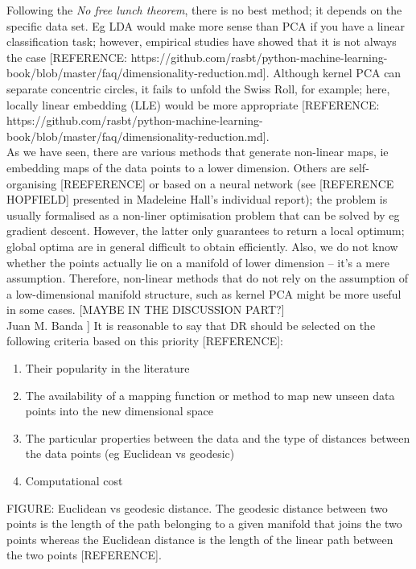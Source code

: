 \documentclass[journal, a4paper]{IEEEtran}
\begin{document}
Following the \textit{No free lunch theorem}, there is no best method; it depends on the specific data set.
Eg LDA would make more sense than PCA if you have a linear classification task; however, empirical studies have showed that it is not always the case [REFERENCE: https://github.com/rasbt/python-machine-learning-book/blob/master/faq/dimensionality-reduction.md]. Although kernel PCA can separate concentric circles, it fails to unfold the Swiss Roll, for example; here, locally linear embedding (LLE) would be more appropriate [REFERENCE: https://github.com/rasbt/python-machine-learning-book/blob/master/faq/dimensionality-reduction.md]. \\
As we have seen, there are various methods that generate non-linear maps, ie embedding maps of the data points to a lower dimension. Others are self-organising [REEFERENCE] or based on a neural network (see [REFERENCE HOPFIELD] presented in Madeleine Hall's individual report); the problem is usually formalised as a non-liner optimisation problem that can be solved by eg gradient descent. However, the latter only guarantees to return a local optimum; global optima are in general difficult to obtain efficiently. Also, we do not know whether the points actually lie on a manifold of lower dimension -- it's a mere assumption.
Therefore, non-linear methods that do not rely on the assumption of a low-dimensional manifold structure, such as kernel PCA might be more useful in some cases. [MAYBE IN THE DISCUSSION PART?]
\\
Juan M. Banda ]
It is reasonable to say that DR should be selected on the following criteria based on this priority [REFERENCE]:
\begin{enumerate}
\item Their popularity in the literature
\item The availability of a mapping function or method to map new unseen data points into the new dimensional space
\item The particular properties between the data and the type of distances between the data points (eg Euclidean vs geodesic)
\item Computational cost
\end{enumerate}


FIGURE: Euclidean vs geodesic distance. The geodesic distance between two points is the length of the path belonging to a given manifold that joins the two points whereas the Euclidean distance is the length of the linear path between the two points [REFERENCE].
\\
\end{document}
